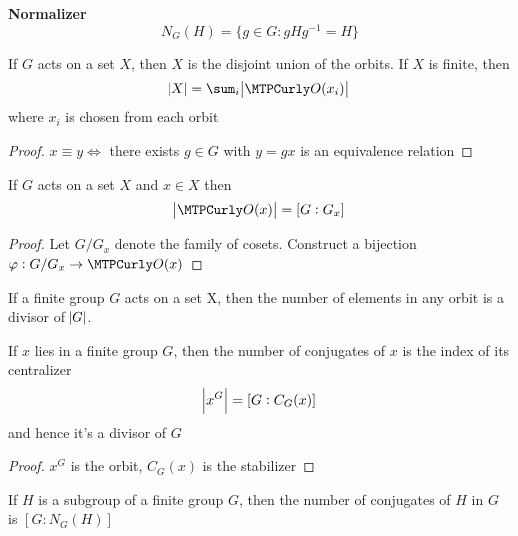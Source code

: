 \documentclass[11pt]{article}
\begin{document}
\textbf{Normalizer}
\begin{equation*}
N_G(H)=\{g\in G:gHg^{-1}=H\}
\end{equation*}


\begin{proposition}[]
If \(G\) acts on a set \(X\), then \(X\) is the disjoint union of the orbits. If
\(X\) is finite, then
\begin{equation*}
\abs{X}=\displaystyle\sum_i\abs{\calo(x_i)}
\end{equation*}
where \(x_i\) is chosen from each orbit
\end{proposition}

\begin{proof}
\(x\equiv y\Leftrightarrow\) there exists \(g\in G\) with \(y=gx\) is an
equivalence relation
\end{proof}


\begin{theorem}[]
\label{thm2.98}
If \(G\) acts on a set \(X\) and \(x\in X\) then
\begin{equation*}
\abs{\calo(x)}=[G:G_x]
\end{equation*}
\end{theorem}

\begin{proof}
Let \(G/G_x\) denote the family of cosets. Construct a bijection
\(\varphi:G/G_x\to \calo(x)\)
\end{proof}

\begin{corollary}[]
\label{cor2.99}
If a finite group \(G\) acts on a set X, then the number of elements in any
orbit is a divisor of \(\abs{G}\). 
\end{corollary}

\begin{corollary}[]
\label{cor2.100}
If \(x\) lies in a finite group \(G\), then the number of conjugates of \(x\) is
the index of its centralizer
\begin{equation*}
\abs{x^G}=[G:C_G(x)]
\end{equation*}
and hence it's a divisor of \(G\)
\end{corollary}

\begin{proof}
\(x^G\) is the orbit, \(C_G(x)\) is the stabilizer
\end{proof}

\begin{proposition}[]
If \(H\) is a subgroup of a finite group \(G\), then the number of conjugates of
\(H\) in \(G\) is \([G:N_G(H)]\)
\end{proposition}
\end{document}
